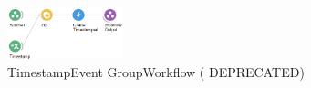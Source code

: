 \begin{figure}[!ht]
    \centering
    \includegraphics[width=0.3\textwidth]{Figures/timestamp_event.png}
    \caption{TimestampEvent GroupWorkflow ({\color{red} DEPRECATED})}
    \label{fig:timestamp_event}
\end{figure}